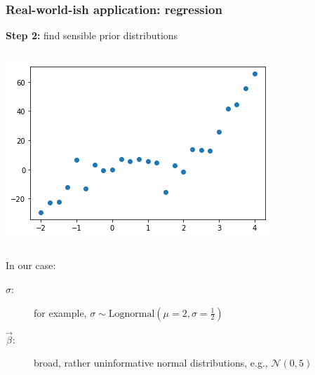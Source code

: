 \documentclass[t,aspectratio=169]{beamer}
\begin{document}
\begin{frame}
  \frametitle{Real-world-ish application: regression}
  \textbf{Step 2:} find sensible prior distributions
  \begin{columns}
    \begin{column}[T]{0.35\textwidth}
      {\centering
        \includegraphics[width=\textwidth]{images/polyfit_data.png}
      }
    \end{column}
  \end{columns}
  In our case:\\
  \begin{description}
  \item[$\sigma$:] for example, $\sigma \sim \mathrm{Lognormal}(\mu=2, \sigma=\frac{1}{2})$
  \item[$\vec \beta$:] broad, rather uninformative normal distributions, e.g., $\mathcal{N}(0, 5)$
  \end{description}
\end{frame}
\end{document}
